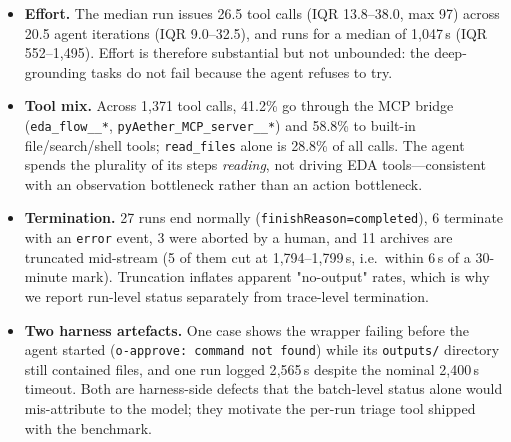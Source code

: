 \begin{itemize}
    \item \textbf{Effort.} The median run issues 26.5 tool calls (IQR 13.8--38.0,
    max 97) across 20.5 agent iterations (IQR 9.0--32.5), and runs for a median
    of 1{,}047\,s (IQR 552--1{,}495). Effort is therefore substantial but not
    unbounded: the deep-grounding tasks do not fail because the agent refuses to
    try.
    \item \textbf{Tool mix.} Across 1{,}371 tool calls, 41.2\% go through the MCP
    bridge (\texttt{eda\_flow\_\_*}, \texttt{pyAether\_MCP\_server\_\_*}) and 58.8\%
    to built-in file/search/shell tools; \texttt{read\_files} alone is 28.8\% of
    all calls. The agent spends the plurality of its steps \emph{reading}, not
    driving EDA tools---consistent with an observation bottleneck rather than an
    action bottleneck.
    \item \textbf{Termination.} 27 runs end normally (\texttt{finishReason=completed}),
    6 terminate with an \texttt{error} event, 3 were aborted by a human, and 11
    archives are truncated mid-stream (5 of them cut at 1{,}794--1{,}799\,s, i.e.\
    within 6\,s of a 30-minute mark). Truncation inflates apparent "no-output"
    rates, which is why we report run-level status separately from trace-level
    termination.
    \item \textbf{Two harness artefacts.} One case shows the wrapper failing before
    the agent started (\texttt{o-approve: command not found}) while its
    \texttt{outputs/} directory still contained files, and one run logged 2{,}565\,s
    despite the nominal 2{,}400\,s timeout. Both are harness-side defects that the
    batch-level status alone would mis-attribute to the model; they motivate the
    per-run triage tool shipped with the benchmark.
\end{itemize}

